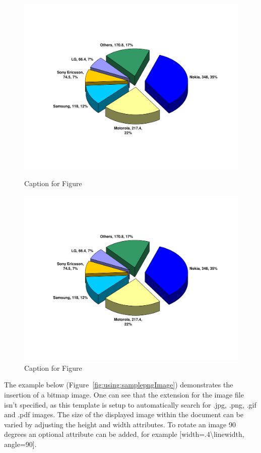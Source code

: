 \begin{figure}[H]
\begin{minipage}[t]{7.2cm}
\begin{center}
\includegraphics*[viewport= 80 130 725 505, width=.8\linewidth]{usingLatex/images/MobileMarketShare2006.pdf}
\caption{Caption for Figure}
\label{fig:using:Example1}
\end{center}
\end{minipage}
\hfill
\begin{minipage}[t]{7.2cm}
\begin{center}
\includegraphics*[viewport= 80 130 725 505, width=.8\linewidth]{usingLatex/images/MobileMarketShare2006.pdf}
\caption{Caption for Figure}
\label{fig:using:Example2}
\end{center}
\end{minipage}
\end{figure}

The example below (Figure~\ref{fig:using:samplepngImage}) demonstrates the insertion of a bitmap image. One can see that the extension for the image file isn't specified, as this template is setup to automatically search for .jpg, .png, .gif and .pdf images. The size of the displayed image within the document can be varied by adjusting the height and width attributes. To rotate an image 90 degrees an optional attribute can be added, for example [width=.4\textbackslash linewidth, angle=90].

